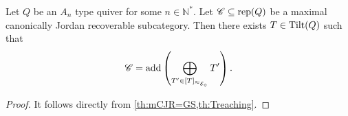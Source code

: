 \begin{cor} \label{cor:CJRGSlink}
Let $Q$ be an $A_n$ type quiver for some $n \in \mathbb{N}^*$. Let $\mathscr{C} \subseteq \operatorname{rep} (Q)$ be a maximal canonically Jordan recoverable subcategory. Then there exists $T \in \operatorname{Tilt}(Q)$ such that \[\mathscr{C} = \operatorname{add} \left( \bigoplus_{T' \in [T]_{\approx_{\mathcal{E}_\diamond}}} T' \right). \]
\end{cor}

\begin{proof}
It follows directly from \cref{th:mCJR=GS,th:Treaching}.
\end{proof}


